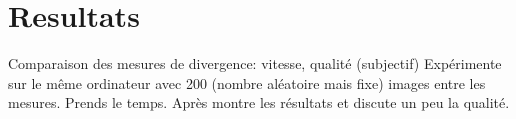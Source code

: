 \documentclass[a4paper]{article}
\begin{document}
\section{Resultats}
Comparaison des mesures de divergence: vitesse, qualit\'e (subjectif)
Exp\'erimente sur le m\^eme ordinateur avec 200 (nombre aléatoire mais fixe) images entre les mesures.
 Prends le temps. Apr\`es montre les r\'esultats et discute un peu la qualit\'e. 

%		
\end{document}
